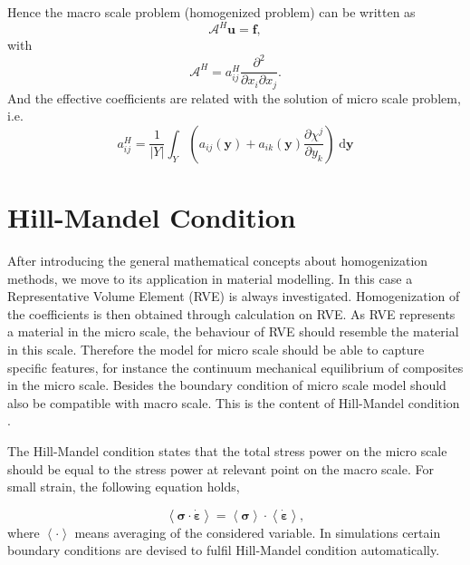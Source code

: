 \documentclass[10pt,a4paper]{scrreprt}
\newcommand{\myd}{\;\mathrm{d}}
\begin{document}
Hence the macro scale problem (homogenized problem) can be written as
\begin{equation}
\mathcal{A}^{H} \mathbf{u} = \mathbf{f},
\end{equation}
with
\begin{equation}
\mathcal{A}^{H} = a^{H}_{ij} \dfrac{\partial^{2}}{\partial x_{i} \partial x_{j}}.
\end{equation}
%
And the effective coefficients are related with the solution of micro scale problem, i.e.
\begin{equation}
a^{H}_{ij} = \dfrac{1}{|Y|} \int_{Y} \left( a_{ij}(\mathbf{y}) + a_{ik}(\mathbf{y}) \dfrac{\partial \chi^{j}}{\partial y_{k}} \right) \myd{\mathbf{y}}
\end{equation}

\section{Hill-Mandel Condition}
After introducing the general mathematical concepts about homogenization methods, we move to its application in material modelling. In this case a Representative Volume Element (RVE) is always investigated. Homogenization of the coefficients is then obtained through calculation on RVE. As RVE represents a material in the micro scale, the behaviour of RVE should resemble the material in this scale. Therefore the model for micro scale should be able to capture specific features, for instance the continuum mechanical equilibrium of composites in the micro scale. Besides the boundary condition of micro scale model should also be compatible with macro scale. This is the content of  Hill-Mandel condition \citep{gluge2012comparison}.

The Hill-Mandel condition states that the total stress power on the micro scale should be equal to the stress power at relevant point on the macro scale. For small strain, the following equation holds,

\begin{equation}
\left< \bm{\sigma} \cdot \dot{\bm{\varepsilon}} \right> = \left< \bm{\sigma} \right> \cdot \left< \dot{\bm{\varepsilon}} \right>,
\end{equation}
where $\left< \cdot \right>$ means averaging of the considered variable. In simulations certain boundary conditions are devised to fulfil Hill-Mandel condition automatically. 

%
%
\end{document}
